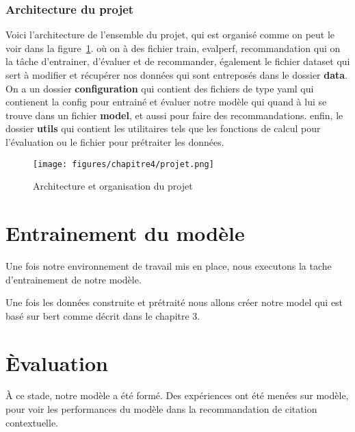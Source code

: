         \subsubsection{Architecture du projet }
        \par Voici l'architecture de l'ensemble du projet, qui est organisé comme on peut le voir dans la figure~\ref{fig:projet}. où on à des fichier train, evalperf, recommandation qui on la tâche d'entrainer, d'évaluer et de recommander, également le fichier dataset qui sert à modifier et récupérer nos données qui sont entreposés dans le dossier \textbf{data}. On a un dossier \textbf{configuration} qui contient des fichiers de type yaml qui contienent la config pour entrainé et évaluer notre modèle qui quand à lui se trouve dans un fichier \textbf{model}, et aussi pour faire des recommandations. enfin, le dossier \textbf{utils} qui contient les utilitaires tels que les fonctions de calcul pour l'évaluation ou le fichier pour prétraiter les données.
        

        \begin{figure}[H]
        	\begin{center}
        		\texttt{[image: figures/chapitre4/projet.png]}
        	\end{center}
        	\caption {Architecture et organisation du projet }
        	\label{fig:projet}
        \end{figure}  
        
        
\section{Entrainement du modèle}
\par Une fois notre environnement de travail mis en place, nous executons la tache d'entrainement de notre modèle.

    
    
\par Une fois les données construite et prétraité nous allons créer notre model qui est basé sur bert comme décrit dans le chapitre 3.
     
    
    
\section{Èvaluation}
\par À ce stade, notre modèle a été formé. Des expériences ont été menées sur modèle, pour voir les performances du modèle dans la recommandation de citation contextuelle. 

